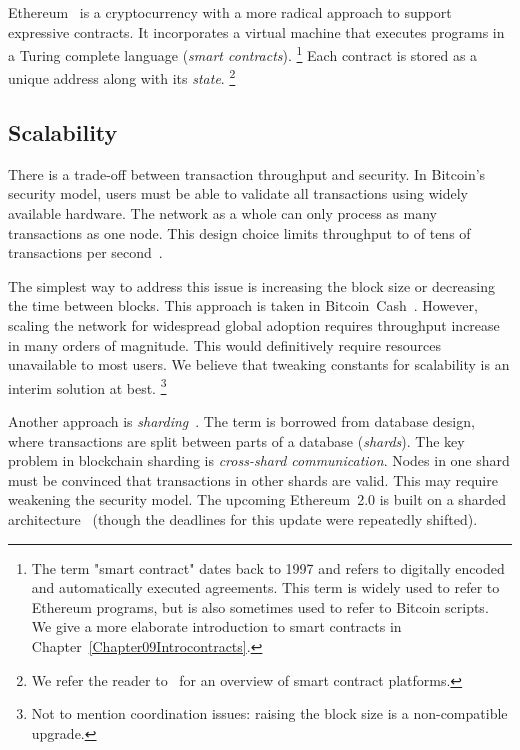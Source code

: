 Ethereum~\cite{Buterin2014, Wood2014} is a cryptocurrency with a more radical approach to support expressive contracts.
It incorporates a virtual machine that executes programs in a Turing complete language (\textit{smart contracts}).
\footnote{The term "smart contract" dates back to 1997 and refers to digitally encoded and automatically executed agreements. This term is widely used to refer to Ethereum programs, but is also sometimes used to refer to Bitcoin scripts. We give a more elaborate introduction to smart contracts in Chapter~\ref{Chapter09Introcontracts}.}
Each contract is stored as a unique address along with its \textit{state}.
\footnote{We refer the reader to~\cite{Bartoletti2017} for an overview of smart contract platforms.}


\subsection{Scalability}

There is a trade-off between transaction throughput and security.
In Bitcoin's security model, users must be able to validate all transactions using widely available hardware.
The network as a whole can only process as many transactions as one node.
This design choice limits throughput to of tens of transactions per second~\cite{Croman2016}.

The simplest way to address this issue is increasing the block size or decreasing the time between blocks.
This approach is taken in Bitcoin~Cash~\cite{Kwon2019}.
However, scaling the network for widespread global adoption requires throughput increase in many orders of magnitude.
This would definitively require resources unavailable to most users.
We believe that tweaking constants for scalability is an interim solution at best.
\footnote{Not to mention coordination issues: raising the block size is a non-compatible upgrade.}

Another approach is \textit{sharding}~\cite{Gencer2016, Luu2016a}.
The term is borrowed from database design, where transactions are split between parts of a database (\textit{shards}).
The key problem in blockchain sharding is \textit{cross-shard communication}.
Nodes in one shard must be convinced that transactions in other shards are valid.
This may require weakening the security model.
The upcoming Ethereum~2.0 is built on a sharded architecture~\cite{ShardingFAQ} (though the deadlines for this update were repeatedly shifted).


